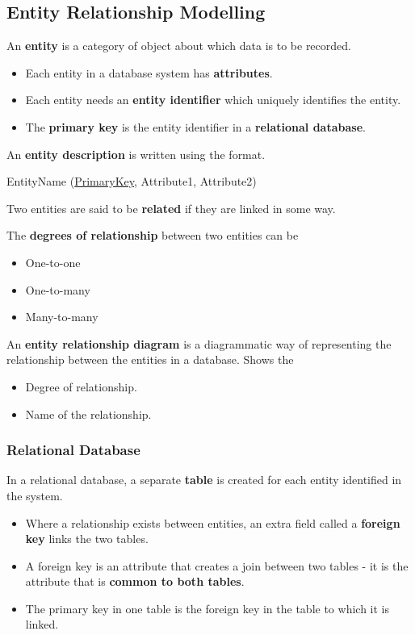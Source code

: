 \subsection{Entity Relationship Modelling}

An \textbf{entity} is a category of object about which data is to be recorded.
\begin{itemize}
    \item Each entity in a database system has \textbf{attributes}.
    \item Each entity needs an \textbf{entity identifier} which uniquely identifies the entity.
    \item The \textbf{primary key} is the entity identifier in a \textbf{relational database}.
\end{itemize}

An \textbf{entity description} is written using the format.
\begin{center}
    EntityName (\underline{PrimaryKey}, Attribute1, Attribute2)
\end{center}

Two entities are said to be \textbf{related} if they are linked in some way.

The \textbf{degrees of relationship} between two entities can be
\begin{itemize}
    \item One-to-one
    \item One-to-many
    \item Many-to-many
\end{itemize}

An \textbf{entity relationship diagram} is a diagrammatic way of representing the relationship between the entities in a database. Shows the
\begin{itemize}
    \item Degree of relationship.
    \item Name of the relationship.
\end{itemize}

\subsubsection*{Relational Database}

In a relational database, a separate \textbf{table} is created for each entity identified in the system.
\begin{itemize}
    \item Where a relationship exists between entities, an extra field called a \textbf{foreign key} links the two tables.
    \item A foreign key is an attribute that creates a join between two tables - it is the attribute that is \textbf{common to both tables}.
    \item The primary key in one table is the foreign key in the table to which it is linked.
\end{itemize}

